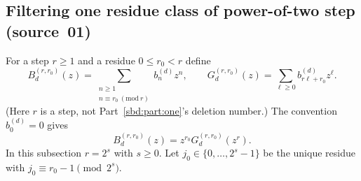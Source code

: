 \documentclass[11pt,a4paper]{article}
\theoremstyle{definition}
\begin{document}
\subsection{Filtering one residue class of power-of-two step (source~01)}
For a step $r\ge1$ and a residue $0\le r_0<r$ define
\begin{equation}\label{sbd:edge:eq:filtered-series}
 B_d^{(r,r_0)}(z)
 =\sum_{\substack{n\ge1\\ n\equiv r_0\ (\mathrm{mod}\ r)}}
       b_n^{(d)}z^n,\qquad
 G_d^{(r,r_0)}(z)
 =\sum_{\ell\ge0}b_{r\ell+r_0}^{(d)}z^\ell.
\end{equation}
(Here $r$ is a step, not Part~\ref{sbd:part:one}'s deletion number.) The
convention $b_0^{(d)}=0$ gives
\begin{equation}\label{sbd:edge:eq:subsequence-composition}
 B_d^{(r,r_0)}(z)=z^{r_0}G_d^{(r,r_0)}(z^r).
\end{equation}
In this subsection $r=2^s$ with $s\ge0$. Let $j_0\in\{0,\ldots,2^s-1\}$ be
the unique residue with $j_0\equiv r_0-1\pmod{2^s}$.
\end{document}
